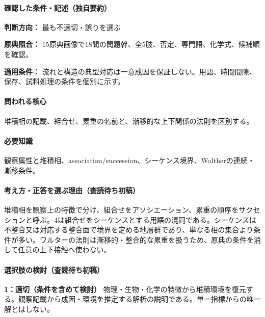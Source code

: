 \paragraph{確認した条件・記述（独自要約）}\mbox{}\par

\noindent\textbf{判断方向：} 最も不適切・誤りを選ぶ\par

\noindent\textbf{原典照合：} 15原典画像で18問の問題幹、全5肢、否定、専門語、化学式、候補順を確認。\par

\noindent\textbf{適用条件：} 流れと構造の典型対応は一意成因を保証しない。用語、時間間隙、保存、試料処理の条件を個別に示す。\par

\paragraph{問われる核心} 堆積相の記載、組合せ、累重の名前と、漸移的な上下関係の法則を区別する。

\paragraph{必要知識} 観察属性と堆積相、association/succession、シーケンス境界、Waltherの連続・漸移条件。

\paragraph{考え方・正答を選ぶ理由（査読待ち初稿）} 堆積相を観察上の特徴で分け、組合せをアソシエーション、累重の順序をサクセションと呼ぶ。4は組合せをシーケンスとする用語の混同である。シーケンスは不整合又は対応する整合面で境界を定める地層群であり、単なる相の集合より条件が多い。ワルターの法則は漸移的・整合的な累重を扱うため、原典の条件を消して任意の上下接触へ使わない。

\paragraph{選択肢の検討（査読待ち初稿）}\mbox{}\par

\noindent\textbf{1：適切（条件を含めて検討）} 物理・生物・化学の特徴から堆積環境を復元する。観察記載から成因・環境を推定する解析の説明である。単一指標からの唯一解とはしない。\par

